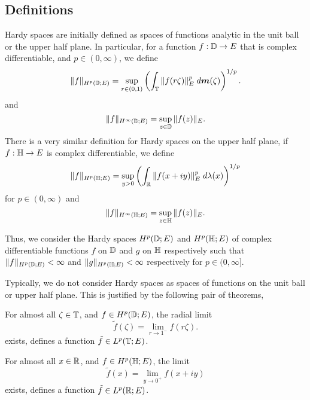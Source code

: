 \documentclass{unswmaths}
\begin{document}
\subsection*{Definitions}
Hardy spaces are initially defined as spaces of functions analytic in the unit
ball or the upper half plane.
In particular, for a function $f:\mathbb{D}\rightarrow E$
that is complex differentiable, and $p \in (0,\infty)$, we define
\begin{equation*}
    \|f\|_{H^p(\mathbb{D};E)} = \sup_{r \in (0,1)} \left(\int_{\mathbb{T}} \|f(r\zeta)\|_E^p\;d\boldsymbol{m}(\zeta)\right)^{1/p}.
\end{equation*}
and
\begin{equation*}
    \|f\|_{H^\infty(\mathbb{D};E)} = \sup_{z \in \mathbb{D}} \|f(z)\|_E.
\end{equation*}
There is a very similar definition for Hardy spaces on the upper half plane,
if $f:\mathbb{H}\rightarrow E$ is complex differentiable, we define
\begin{equation*}
    \|f\|_{H^p(\mathbb{H};E)} = \sup_{y>0} \left(\int_{\mathbb{R}} \|f(x+iy)\|_E^p\;d\lambda(x)\right)^{1/p}
\end{equation*}
for $p \in (0,\infty)$
and
\begin{equation*}
    \|f\|_{H^\infty(\mathbb{H};E)} = \sup_{z \in \mathbb{H}} \|f(z)\|_E.
\end{equation*} 

Thus, we consider the Hardy spaces $H^p(\mathbb{D};E)$ and $H^p(\mathbb{H};E)$
of complex differentiable functions $f$ on $\mathbb{D}$ and $g$ on $\mathbb{H}$
respectively such that $\|f\|_{H^p(\mathbb{D};E)} < \infty$ and $\|g\|_{H^p(\mathbb{H};E)} < \infty$
respectively for $p \in (0,\infty]$. 

Typically, we do not consider Hardy spaces as spaces of functions
on the unit ball or upper half plane. This is justified
by the following pair of theorems,
\begin{theorem}
    For almost all $\zeta \in \mathbb{T}$, and $f \in H^p(\mathbb{D};E)$, the radial limit
    \begin{equation*}
        \tilde{f}(\zeta) = \lim_{r\rightarrow1^{-}}f(r\zeta).
    \end{equation*}
    exists, defines a function $\tilde{f} \in L^p(\mathbb{T};E)$.
\end{theorem}
\begin{theorem}
    For almost all $x \in \mathbb{R}$, and $f \in H^p(\mathbb{H};E)$, the limit
    \begin{equation*}
        \tilde{f}(x) = \lim_{y\rightarrow 0^{+}} f(x+iy)
    \end{equation*}
    exists, defines a function $\tilde{f} \in L^p(\mathbb{R};E)$.
\end{theorem}
\end{document}
